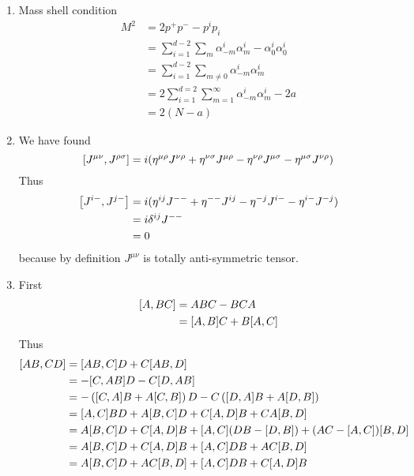\begin{enumerate}[label=(\alph*)]
	\item Mass shell condition
		\begin{align*}
			M^2 &= 2p^+p^- - p^i p_i \\
				 &= \sum_{i=1}^{d-2} \sum_m \alpha_{-m}^i \alpha_{m}^i - \alpha^i_0 \alpha^i_0 \\
				 &= \sum_{i=1}^{d-2} \sum_{m \neq 0} \alpha_{-m}^i \alpha_{m}^i \\
				 &= 2 \sum_{i=1}^{d=2} \sum_{m=1}^{\infty} \alpha^i_{-m} \alpha^i_{m} - 2 a \\
				 &= 2 (N-a)
		\end{align*}
	\item 
		We have found 
		\begin{equation}
			\comm{J^{\mu\nu}}{J^{\rho\sigma}} = i (\eta^{\mu \rho} J^{\nu\rho} + \eta^{\nu\sigma} J^{\mu\rho} - \eta^{\nu\rho} J^{\mu\sigma} - \eta^{\mu\sigma} J^{\nu\rho})
		\end{equation}
		Thus
		\begin{align*}
			\comm{J^{i-}}{J^{j-}} &= i (\eta^{i j} J^{--} + \eta^{--} J^{ij} - \eta^{-j} J^{i-} - \eta^{i-} J^{-j}) \\
										 &= i \delta^{ij} J^{--} \\
										 &= 0
		\end{align*}
		because by definition $J^{\mu\nu}$ is totally anti-symmetric tensor.

	\item First
		\begin{align*}
			\comm{A}{BC} &= ABC - BCA \\
							 &= \comm{A}{B}C + B\comm{A}{C}
		\end{align*}
		Thus
		\begin{align*}
			\comm{AB}{CD} &= \comm{AB}{C} D + C \comm{AB}{D} \\
							  &= -\comm{C}{AB} D - C \comm{D}{AB} \\
							  &= -\left(\comm{C}{A}B + A \comm{C}{B} \right) D - C \left(\comm{D}{A}B + A \comm{D}{B} \right) \\
							  &= \comm{A}{C}BD + A \comm{B}{C} D + C\comm{A}{D} B + C A \comm{B}{D} \\
							  &= A \comm{B}{C} D + C\comm{A}{D} B + \comm{A}{C} (DB - \comm{D}{B}) + (AC - \comm{A}{C})\comm{B}{D}\\ 
							  &= A \comm{B}{C} D + C\comm{A}{D} B + \comm{A}{C} DB + AC \comm{B}{D} \\
							  &= A \comm{B}{C} D + AC \comm{B}{D}  + \comm{A}{C} DB + C\comm{A}{D} B
		\end{align*}


\end{enumerate}
